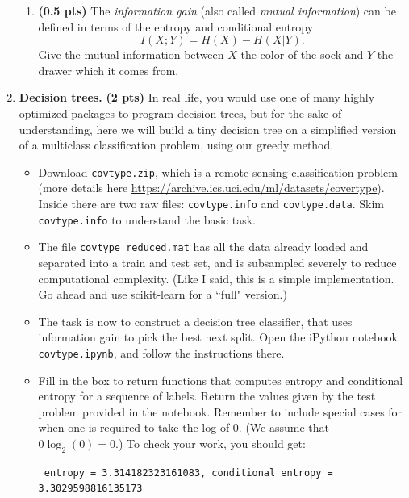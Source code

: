 \documentclass{article}
\newcommand{\showpoints}[1]{\textbf{(#1)}}
\begin{document}
\begin{enumerate}
\begin{enumerate}
\item \showpoints{0.5 pts} The \emph{information gain} (also called \emph{mutual information}) can be defined in terms of the entropy and conditional entropy 
\[
I(X;Y) = H(X) - H(X|Y). 
\]
Give the mutual information between $X$ the color of the sock and $Y$ the drawer which it comes from. 




 
\end{enumerate}






\item \textbf{Decision trees.} \showpoints{2 pts}  In real life, you would use one of many highly optimized packages to program decision trees, but for the sake of understanding, here we will build a tiny decision tree on a simplified version of a multiclass classification problem, using our greedy method. 

\begin{itemize}
\item Download \texttt{covtype.zip},  which is a remote sensing classification problem (more details here \url{https://archive.ics.uci.edu/ml/datasets/covertype}). Inside there are two raw files: \texttt{covtype.info} and \texttt{covtype.data}. Skim \texttt{covtype.info} to understand the basic task. 

\item The file \texttt{covtype\_reduced.mat} has all the data already loaded and separated into a train and test set, and is subsampled severely to reduce computational complexity. (Like I said, this is a simple implementation. Go ahead and use scikit-learn for a ``full" version.)

\item The task is now to construct a decision tree classifier, that uses information gain to pick the best next split. Open the iPython notebook \texttt{covtype.ipynb}, and follow the instructions there.

\item Fill in the box to return functions that computes entropy and conditional entropy for a sequence of labels. Return the values given by the test problem provided in the notebook. Remember to include special cases for when one is required to take the log of 0. (We assume that $0\log_2(0) = 0$.)
To check your work, you should get:

\texttt{
entropy =  3.314182323161083, conditional entropy =  3.3029598816135173}



\end{itemize}
\end{enumerate}
\end{document}
